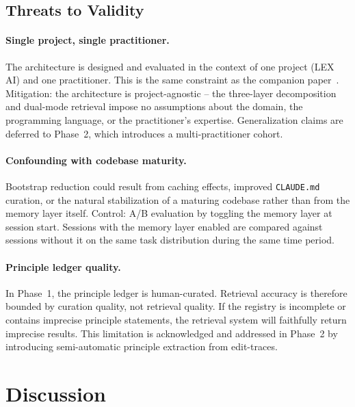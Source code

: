 \documentclass[11pt]{article}
\begin{document}
\subsection{Threats to Validity}
\label{sec:threats}

\paragraph{Single project, single practitioner.}
The architecture is designed and evaluated in the context of one project (LEX AI) and one practitioner.
This is the same constraint as the companion paper~\citep[\S8]{ovcharov2026recursive}.
Mitigation: the architecture is project-agnostic -- the three-layer decomposition and dual-mode retrieval impose no assumptions about the domain, the programming language, or the practitioner's expertise.
Generalization claims are deferred to Phase~2, which introduces a multi-practitioner cohort.

\paragraph{Confounding with codebase maturity.}
Bootstrap reduction could result from caching effects, improved \texttt{CLAUDE.md} curation, or the natural stabilization of a maturing codebase rather than from the memory layer itself.
Control: A/B evaluation by toggling the memory layer at session start.
Sessions with the memory layer enabled are compared against sessions without it on the same task distribution during the same time period.

\paragraph{Principle ledger quality.}
In Phase~1, the principle ledger is human-curated.
Retrieval accuracy is therefore bounded by curation quality, not retrieval quality.
If the registry is incomplete or contains imprecise principle statements, the retrieval system will faithfully return imprecise results.
This limitation is acknowledged and addressed in Phase~2 by introducing semi-automatic principle extraction from edit-traces.


\section{Discussion}
\label{sec:discussion}
\end{document}
